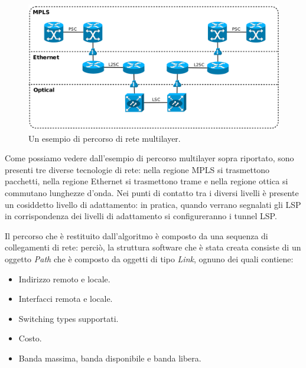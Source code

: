 \documentclass[10pt,a4paper]{report}
\begin{document}
\begin{figure}[!htbp]
  \begin{center}
    \includegraphics[width=1\textwidth]{img/multi_path}
    \caption[]{Un esempio di percorso di rete multilayer.}
  \end{center}
\end{figure}

Come possiamo vedere dall'esempio di percorso multilayer sopra
riportato, sono presenti tre diverse tecnologie di rete: nella regione
MPLS si trasmettono pacchetti, nella regione Ethernet si trasmettono
trame e nella regione ottica si commutano lunghezze d'onda. Nei punti
di contatto tra i diversi livelli è presente un cosiddetto livello di
adattamento: in pratica, quando verrano segnalati gli LSP in
corrispondenza dei livelli di adattamento si configureranno i tunnel
LSP.

Il percorso che è restituito dall'algoritmo è composto da una sequenza
di collegamenti di rete: perciò, la struttura software che è stata
creata consiste di un oggetto \textit{Path} che è composto da oggetti
di tipo \textit{Link}, ognuno dei quali contiene:

\begin{itemize}
\item Indirizzo remoto e locale.
\item Interfacci remota e locale.
\item Switching types supportati.
\item Costo.
\item Banda massima, banda disponibile e banda libera.
\end{itemize}
\end{document}
